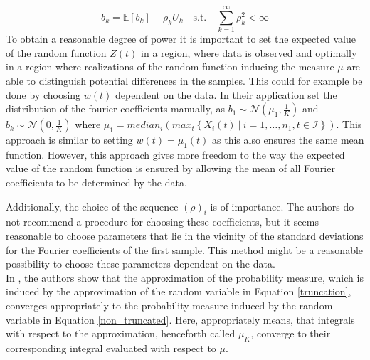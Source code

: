 \documentclass[12pt, a4paper]{article}
\theoremstyle{MAstyle} \newtheorem{assumption}{Assumption}[section]
\theoremstyle{MAstyle} \newtheorem{definition}{Definition}[section]
\theoremstyle{MAstyle} \newtheorem{theorem}{Theorem}[section]
\begin{document}
			\begin{equation}
				b_k = \mathbb{E}\left[b_k\right] + \rho_k U_k
				\quad \text{s.t.} \quad
				\sum_{k = 1}^{\infty} \rho_k^2 < \infty 
			\end{equation}
			To obtain a reasonable degree of power it is important to set the expected value of the random function $Z(t)$ in a region, where data is observed and optimally in a region where realizations of the random function inducing the measure $\mu$ are able to distinguish potential differences in the samples. This could for example be done by choosing $w(t)$ dependent on the data. In their application \cite{bugni_permutation_2021} set the distribution of the fourier coefficients manually, as $b_1 \sim \mathcal{N}(\mu_1, \frac{1}{K})$ and $b_k \sim \mathcal{N}(0, \frac{1}{K})$ where $\mu_1 = \textit{median}_i \left(\textit{max}_t\left\{X_i(t) \ | \ i = 1, \dots, n_1, t\in \mathcal{I}\right\}\right)$. This approach is similar to setting $w(t) = \mu_1(t)$ as this also ensures the same mean function. However, this approach gives more freedom to the way the expected value of the random function is ensured by allowing the mean of all Fourier coefficients to be determined by the data.
			
			Additionally, the choice of the sequence $(\rho)_i$ is of importance. The authors do not recommend a procedure for choosing these coefficients, but it seems reasonable to choose parameters that lie in the vicinity of the standard deviations for the Fourier coefficients of the first sample. This method might be a reasonable possibility to choose these parameters dependent on the data.\\
			
			In \cite{bugni_goodness--fit_2009}, the authors show that the approximation of the probability measure, which is induced by the approximation of the random variable in Equation \ref{truncation}, converges appropriately to the probability measure induced by the random variable in Equation \ref{non_truncated}. Here, appropriately means, that integrals with respect to the approximation, henceforth called $\mu_K$, converge to their corresponding integral evaluated with respect to $\mu$.\\
			
\end{document}

